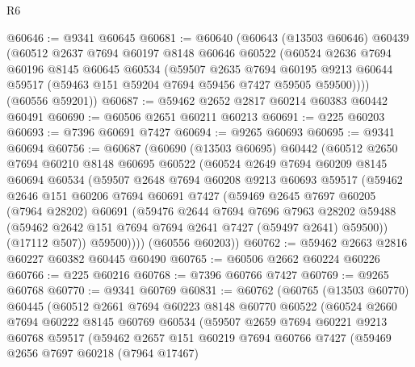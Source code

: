 \begin{lexlean}{R6}
\begin{coremodule}
@60646 := @9341 @60645
@60681 := @60640
    (@60643
      (@13503 @60646)
      @60439
      (@60512
        @2637
        @7694
        @60197
        @8148
        @60646
        @60522
        (@60524
          @2636
          @7694
          @60196
          @8145
          @60645
          @60534
          (@59507
            @2635
            @7694
            @60195
            @9213
            @60644
            @59517
            (@59463 @151 @59204 @7694 @59456 @7427 @59505 @59500))))
      (@60556 @59201))
@60687 := @59462 @2652 @2817 @60214 @60383 @60442 @60491
@60690 := @60506 @2651 @60211 @60213
@60691 := @225 @60203
@60693 := @7396 @60691 @7427
@60694 := @9265 @60693
@60695 := @9341 @60694
@60756 := @60687
    (@60690
      (@13503 @60695)
      @60442
      (@60512
        @2650
        @7694
        @60210
        @8148
        @60695
        @60522
        (@60524
          @2649
          @7694
          @60209
          @8145
          @60694
          @60534
          (@59507
            @2648
            @7694
            @60208
            @9213
            @60693
            @59517
            (@59462
              @2646
              @151
              @60206
              @7694
              @60691
              @7427
              (@59469
                @2645
                @7697
                @60205
                (@7964 @28202)
                @60691
                (@59476
                  @2644
                  @7694
                  @7696
                  @7963
                  @28202
                  @59488
                  (@59462 @2642 @151 @7694 @7694 @2641 @7427 (@59497 @2641) @59500))
                (@17112 @507))
              @59500))))
      (@60556 @60203))
@60762 := @59462 @2663 @2816 @60227 @60382 @60445 @60490
@60765 := @60506 @2662 @60224 @60226
@60766 := @225 @60216
@60768 := @7396 @60766 @7427
@60769 := @9265 @60768
@60770 := @9341 @60769
@60831 := @60762
    (@60765
      (@13503 @60770)
      @60445
      (@60512
        @2661
        @7694
        @60223
        @8148
        @60770
        @60522
        (@60524
          @2660
          @7694
          @60222
          @8145
          @60769
          @60534
          (@59507
            @2659
            @7694
            @60221
            @9213
            @60768
            @59517
            (@59462
              @2657
              @151
              @60219
              @7694
              @60766
              @7427
              (@59469
                @2656
                @7697
                @60218
                (@7964 @17467)

\end{coremodule}
\end{lexlean}
